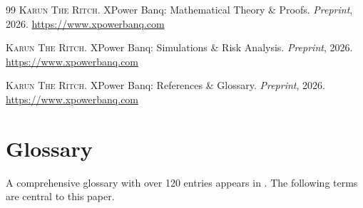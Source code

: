 \documentclass[10pt,a4paper,twocolumn]{article}
\begin{document}
\begin{thebibliography}{99}
\textsc{Karun The Ritch}.
\newblock XPower Banq: Mathematical Theory \& Proofs.
\newblock \emph{Preprint}, 2026.
\newblock \url{https://www.xpowerbanq.com}

\textsc{Karun The Ritch}.
\newblock XPower Banq: Simulations \& Risk Analysis.
\newblock \emph{Preprint}, 2026.
\newblock \url{https://www.xpowerbanq.com}

\textsc{Karun The Ritch}.
\newblock XPower Banq: References \& Glossary.
\newblock \emph{Preprint}, 2026.
\newblock \url{https://www.xpowerbanq.com}

\end{thebibliography}
\fi

\ifbundle\else
\section*{Glossary}
\label{sec:glossary}

\noindent A comprehensive glossary with over 120 entries appears in \cite{ref}. The following terms are central to this paper.
\end{document}
